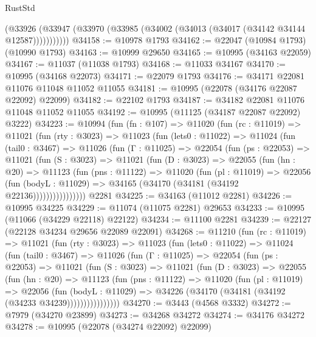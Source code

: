 \begin{lexlean}{RustStd}
\begin{coremodule}
          (@33926 (@33947 (@33970 (@33985 (@34002 (@34013 (@34017 (@34142 @34144 @12587)))))))))))
@34158 := @10978 @1793
@34162 := @22047 (@10984 @1793) (@10990 @1793)
@34163 := @10999 @29650
@34165 := @10995 (@34163 @22059)
@34167 := @11037 (@11038 @1793)
@34168 := @11033 @34167
@34170 := @10995 (@34168 @22073)
@34171 := @22079 @1793
@34176 := @34171 @22081 @11076 @11048 @11052 @11055
@34181 := @10995 (@22078 (@34176 @22087 @22092) @22099)
@34182 := @22102 @1793
@34187 := @34182 @22081 @11076 @11048 @11052 @11055
@34192 := @10995 (@11125 (@34187 @22087 @22092) @3222)
@34223 := @10994
    (fun (fn : @107) =>
    @11020
      (fun (rc : @11019) =>
      @11021
        (fun (rty : @3023) =>
        @11023
          (fun (lets0 : @11022) =>
          @11024
            (fun (tail0 : @3467) =>
            @11026
              (fun (Γ : @11025) =>
              @22054
                (fun (ps : @22053) =>
                @11021
                  (fun (S : @3023) =>
                  @11021
                    (fun (D : @3023) =>
                    @22055
                      (fun (hn : @20) =>
                      @11123
                        (fun (pns : @11122) =>
                        @11020
                          (fun (pl : @11019) =>
                          @22056
                            (fun (bodyL : @11029) =>
                            @34165 (@34170 (@34181 (@34192 @22136))))))))))))))))
    @2281
@34225 := @34163 (@11012 @2281)
@34226 := @10995 @34225
@34229 := @11074 (@11075 @2281) @29653
@34233 := @10995 (@11066 (@34229 @22118) @22122)
@34234 := @11100 @2281
@34239 := @22127 (@22128 @34234 @29656 @22089 @22091)
@34268 := @11210
    (fun (rc : @11019) =>
    @11021
      (fun (rty : @3023) =>
      @11023
        (fun (lets0 : @11022) =>
        @11024
          (fun (tail0 : @3467) =>
          @11026
            (fun (Γ : @11025) =>
            @22054
              (fun (ps : @22053) =>
              @11021
                (fun (S : @3023) =>
                @11021
                  (fun (D : @3023) =>
                  @22055
                    (fun (hn : @20) =>
                    @11123
                      (fun (pns : @11122) =>
                      @11020
                        (fun (pl : @11019) =>
                        @22056
                          (fun (bodyL : @11029) =>
                          @34226 (@34170 (@34181 (@34192 (@34233 @34239))))))))))))))))
@34270 := @3443 (@4568 @3332)
@34272 := @7979 (@34270 @23899)
@34273 := @34268 @34272
@34274 := @34176 @34272
@34278 := @10995 (@22078 (@34274 @22092) @22099)

\end{coremodule}
\end{lexlean}
